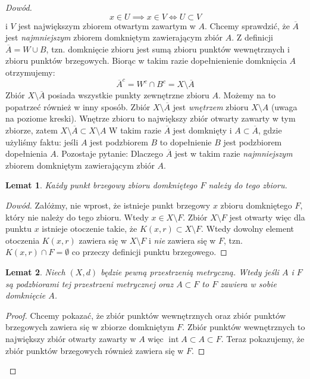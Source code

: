\documentclass{article}
\newtheorem{lemma}{Lemat}
\DeclareMathOperator{\interior}{int}
\begin{document}
\begin{proof}[Dowód]
    \begin{equation*}
        x \in U \implies x \in V \iff U \subset V
    \end{equation*}
    i \(V\) jest największym zbiorem otwartym zawartym w \(A\).
    \newline
    Chcemy sprawdzić, że \(\overline{A}\) jest \emph{najmniejszym} zbiorem domkniętym zawierającym zbiór \(A\).
    Z definicji \(\overline{A} = W \cup B\), tzn. domknięcie zbioru jest sumą zbioru punktów wewnętrznych i zbioru
    punktów brzegowych. Biorąc w takim razie dopełnienienie domknięcia \(A\) otrzymujemy:
    \begin{equation*}
        \overline{A}^{c} = W^c \cap B^c = X \setminus \overline{A}
    \end{equation*}
    Zbiór \(X \setminus \overline{A}\) posiada wszystkie punkty zewnętrzne zbioru \(A\). Możemy na to popatrzeć również
    w inny sposób. Zbiór \(X \setminus \overline{A}\) jest \emph{wnętrzem} zbioru \(X \setminus A\) (uwaga na poziome kreski).
    Wnętrze zbioru to największy zbiór otwarty zawarty w tym zbiorze, zatem \(X \setminus \overline{A} \subset X \setminus A\)
    W takim razie  \(\overline{A}\) jest domknięty i \(A \subset \overline{A}\),
    gdzie użyliśmy faktu: jeśli \(A\) jest podzbiorem \(B\) to dopełnienie \(B\) jest podzbiorem dopełnienia \(A\).
    Pozostaje pytanie: Dlaczego \(\overline{A}\) jest w takim razie \emph{najmniejszym} zbiorem domkniętym zawierającym zbiór \(A\).

    \begin{lemma}
        Każdy punkt brzegowy zbioru domkniętego \(F\) należy do tego zbioru.
    \end{lemma}
    \begin{proof}[Dowód]
        Załóżmy, nie wprost, że istnieje punkt brzegowy \(x\) zbioru domkniętego \(F\), który nie należy do tego zbioru.
        Wtedy \(x \in X \setminus F\). Zbiór \(X \setminus F\) jest otwarty więc dla punktu \(x\) istnieje otoczenie
        takie, że \(K(x, r) \subset X \setminus F\). Wtedy dowolny element otoczenia \(K(x, r)\) zawiera się w
        \(X \setminus F\) i \emph{nie} zawiera się w \(F\), tzn. \(K(x, r) \cap F = \emptyset\) co przeczy
        definicji punktu brzegowego.
    \end{proof}
    \begin{lemma}
        Niech \((X, d)\) będzie pewną przestrzenią metryczną. Wtedy jeśli \(A\) i \(F\) są podzbiorami tej przestrzeni
        metrycznej oraz \(A \subset F\) to \(F\) zawiera w sobie domknięcie \(A\).
    \end{lemma}
    \begin{proof}
        Chcemy pokazać, że zbiór punktów wewnętrznych oraz zbiór punktów brzegowych zawiera się w zbiorze domkniętym \(F\).
        Zbiór punktów wewnętrznych to największy zbiór otwarty zawarty w \(A\) więc \(\interior{A} \subset A \subset F\).
        Teraz pokazujemy, że zbiór punktów brzegowych również zawiera się w \(F\).
    \end{proof}
\end{proof}
\end{document}
